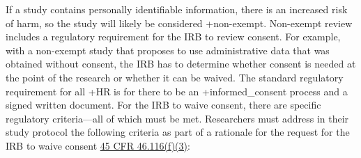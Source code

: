 \documentclass[
]{WileySix}
\begin{document}
If a study contains personally identifiable information, there is an increased risk of harm, so the study will likely be considered +non-exempt\textbar. Non-exempt review includes a regulatory requirement for the IRB to review consent. For example, with a non-exempt study that proposes to use administrative data that was obtained without consent, the IRB has to determine whether consent is needed at the point of the research or whether it can be waived. The standard regulatory requirement for all +HR\textbar{} is for there to be an +informed\_consent\textbar{} process and a signed written document. For the IRB to waive consent, there are specific regulatory criteria---all of which must be met. Researchers must address in their study protocol the following criteria as part of a rationale for the request for the IRB to waive consent \href{https://www.law.cornell.edu/cfr/text/45/46.116}{45 CFR 46.116(f)(3)}:
\end{document}
